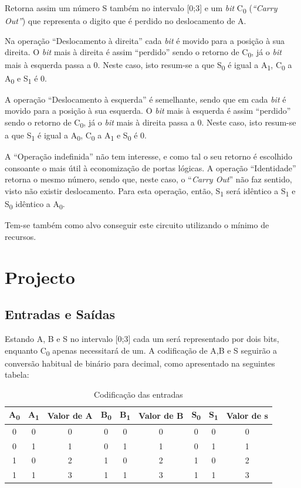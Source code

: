\documentclass[a4paper,12pt]{article}
\begin{document}
Retorna assim um número S também no intervalo [0;3] e um {\it bit} C\textsubscript{0} ({\it ``Carry Out''}) que representa o digito que é perdido no deslocamento de A. 
\par
Na operação ``Deslocamento à direita'' cada {\it bit} é movido para a posição à sua direita. O {\it bit} mais à direita é assim ``perdido'' sendo o retorno de C\textsubscript{0}, já o {\it bit} mais à esquerda passa a 0. Neste caso, isto resum-se a que S\textsubscript{0} é igual a A\textsubscript{1}, C\textsubscript{0} a A\textsubscript{0} e S\textsubscript{1} é 0.
\par
A operação ``Deslocamento à esquerda'' é semelhante, sendo que em cada {\it bit} é movido para a posição à sua esquerda. O {\it bit} mais à esquerda é assim ``perdido'' sendo o retorno de C\textsubscript{0}, já o {\it bit} mais à direita passa a 0. Neste caso, isto resum-se a que S\textsubscript{1} é igual a A\textsubscript{0}, C\textsubscript{0} a A\textsubscript{1} e S\textsubscript{0} é 0.
\par
A ``Operação indefinida'' não tem interesse, e como tal o seu retorno é escolhido consoante o mais útil à economização de portas lógicas. A operação ``Identidade'' retorna o mesmo número, sendo que, neste caso, o ``{\it Carry Out}'' não faz sentido, visto não existir deslocamento. Para esta operação, então, S\textsubscript{1} será idêntico a S\textsubscript{1} e S\textsubscript{0} idêntico a A\textsubscript{0}.
\par

Tem-se também como alvo conseguir este circuito utilizando o mínimo de recursos.

\section{Projecto}

\subsection{Entradas e Saídas}
Estando A, B e S no intervalo [0;3] cada um será representado por dois bits, enquanto C\textsubscript{0} apenas necessitará de um. A codificação de A,B e S seguirão a conversão habitual de binário para decimal, como apresentado na seguintes tabela:
 

\begin{table}[h]
\centering
\begin{tabular}{|| c | c | c || c | c | c || c | c | c ||}
\hline
A\textsubscript{0} & A\textsubscript{1} & Valor de A & B\textsubscript{0} & B\textsubscript{1} & Valor de B & S\textsubscript{0} & S\textsubscript{1} & Valor de s \\ \hline
0 & 0 & 0 & 0 & 0 & 0 & 0 & 0 & 0  \\
0 & 1 & 1 & 0 & 1 & 1 & 0 & 1 & 1 \\
1 & 0 & 2 & 1 & 0 & 2 & 1 & 0 & 2 \\
1 & 1 & 3 & 1 & 1 & 3 & 1 & 1 & 3 \\ \hline
\end{tabular}
\caption{Codificação das entradas} %
\end{table}
\end{document}
